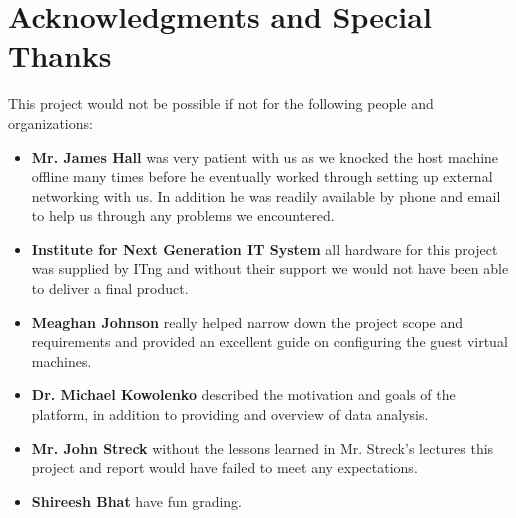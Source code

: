\section{Acknowledgments and Special Thanks}

This project would not be possible if not for the following people and
organizations:

\begin{itemize}
  \item \textbf{Mr. James Hall} was very patient with us as we knocked
the host machine offline many times before he eventually worked through
setting up external networking with us. In addition he was readily
available by phone and email to help us through any problems we
encountered.
  \item \textbf{Institute for Next Generation IT System} all hardware
for this project was supplied by ITng and without their support we would
not have been able to deliver a final product.
  \item \textbf{Meaghan Johnson} really helped narrow down the project
scope and requirements and provided an excellent guide on configuring
the guest virtual machines.
  \item \textbf{Dr. Michael Kowolenko} described the motivation and goals
of the platform, in addition to providing and overview of data analysis. 
  \item \textbf{Mr. John Streck} without the lessons learned in Mr.
Streck's lectures this project and report would have failed to meet any
expectations.
  \item \textbf{Shireesh Bhat} have fun grading.
\end{itemize}
